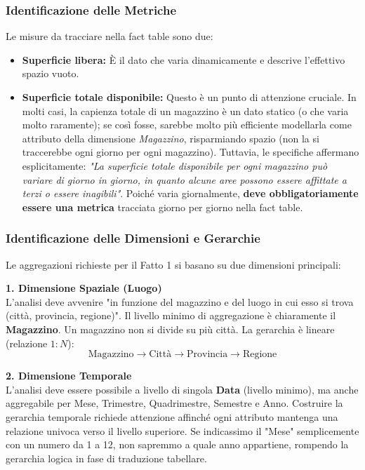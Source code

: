 \subsubsection{Identificazione delle Metriche}
Le misure da tracciare nella fact table sono due:
\begin{itemize}
    \item \textbf{Superficie libera:} È il dato che varia dinamicamente e descrive l'effettivo spazio vuoto.
    \item \textbf{Superficie totale disponibile:} Questo è un punto di attenzione cruciale. In molti casi, la capienza totale di un magazzino è un dato statico (o che varia molto raramente); se così fosse, sarebbe molto più efficiente modellarla come attributo della dimensione \textit{Magazzino}, risparmiando spazio (non la si traccerebbe ogni giorno per ogni magazzino). Tuttavia, le specifiche affermano esplicitamente: \textit{"La superficie totale disponibile per ogni magazzino può variare di giorno in giorno, in quanto alcune aree possono essere affittate a terzi o essere inagibili"}. Poiché varia giornalmente, \textbf{deve obbligatoriamente essere una metrica} tracciata giorno per giorno nella fact table.
\end{itemize}

\subsubsection{Identificazione delle Dimensioni e Gerarchie}
Le aggregazioni richieste per il Fatto 1 si basano su due dimensioni principali:

\textbf{1. Dimensione Spaziale (Luogo)} \\
L'analisi deve avvenire "in funzione del magazzino e del luogo in cui esso si trova (città, provincia, regione)".
Il livello minimo di aggregazione è chiaramente il \textbf{Magazzino}. Un magazzino non si divide su più città. La gerarchia è lineare (relazione $1:N$):
\[\text{Magazzino} \rightarrow \text{Città} \rightarrow \text{Provincia} \rightarrow \text{Regione}\]

\textbf{2. Dimensione Temporale} \\
L'analisi deve essere possibile a livello di singola \textbf{Data} (livello minimo), ma anche aggregabile per Mese, Trimestre, Quadrimestre, Semestre e Anno.
Costruire la gerarchia temporale richiede attenzione affinché ogni attributo mantenga una relazione univoca verso il livello superiore. Se indicassimo il "Mese" semplicemente con un numero da 1 a 12, non sapremmo a quale anno appartiene, rompendo la gerarchia logica in fase di traduzione tabellare.

